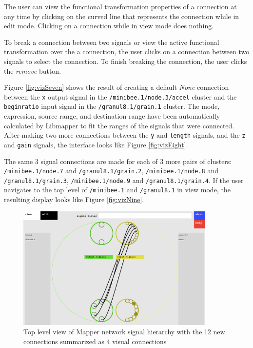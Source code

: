 The user can view the functional transformation properties of a connection at any time by clicking on the curved line that represents the connection while in edit mode. Clicking on a connection while in view mode does nothing.

To break a connection between two signals or view the active functional transformation over the a connection, the user clicks on a connection between two signals to select the connection. To finish breaking the connection, the user clicks the \emph{remove} button.

Figure \ref{fig:vizSeven} shows the result of creating a default \emph{None} connection between the \verb#x# output signal in the \verb#/minibee.1/node.3/accel# cluster and the \verb#beginratio# input signal in the \verb#/granul8.1/grain.1# cluster. The mode, expression, source range, and destination range have been automatically calculated by Libmapper to fit the ranges of the signals that were connected. After making two more connections between the \verb#y# and \verb#length# signals, and the \verb#z# and \verb#gain# signals, the interface looks like Figure \ref{fig:vizEight}.

The same 3 signal connections are made for each of 3 more pairs of clusters: \verb#/minibee.1/node.7# and \verb#/granul8.1/grain.2#, \verb#/minibee.1/node.8# and \verb#/granul8.1/grain.3#, \verb#/minibee.1/node.9# and \verb#/granul8.1/grain.4#. If the user navigates to the top level of \verb#/minibee.1# and \verb#/granul8.1# in view mode, the resulting display looks like Figure \ref{fig:vizNine}.

\begin{figure}[hp]
\centering
\includegraphics[width=0.88\textwidth]{vizmapperTen.png}
\caption{Top level view of Mapper network signal hierarchy with the 12 new connections summarized as 4 visual connections}
\label{fig:vizTen}
\end{figure}

